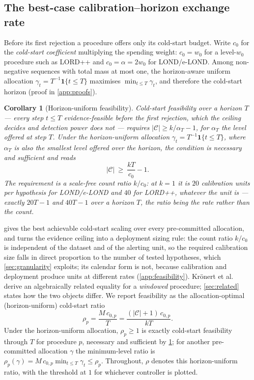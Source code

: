 \documentclass[conference]{IEEEtran}
\newtheorem{corollary}{Corollary}
\newcommand{\Cal}{\mathcal{C}}
\newcommand{\nCal}{\lvert\Cal\rvert}
\newcommand{\ceil}{M}
\begin{document}
\subsection{The best-case calibration--horizon exchange rate}\label{sec:exchange}

Before its first rejection a procedure offers only its cold-start budget. Write $c_0$ for the
\emph{cold-start coefficient} multiplying the spending weight: $c_0=w_0$ for a level-$w_0$ procedure
such as LORD++ and $c_0=\alpha=2w_0$ for LOND/e-LOND. Among non-negative sequences with total mass at
most one, the horizon-aware uniform allocation $\gamma_t=T^{-1}\mathbf 1\{t\le T\}$ maximises $\min_{t\le T}\gamma_t$, and
therefore the cold-start horizon (proof in \cref{app:proofs}).

\begin{corollary}[Horizon-uniform feasibility]\label{cor:budget}
Cold-start feasibility over a horizon $T$ --- every step $t\le T$ evidence-feasible before the first
rejection, which the ceiling decides and detection power does not --- requires $\nCal\ge k/\alpha_T-1$,
for $\alpha_T$ the level offered at step $T$. Under the horizon-uniform allocation
$\gamma_t=T^{-1}\mathbf 1\{t\le T\}$, where $\alpha_T$ is also the smallest level offered over the
horizon, the condition is necessary \emph{and} sufficient and reads
\[
\nCal\ \ge\ \frac{kT}{c_0}-1 .
\]
The requirement is a scale-free count ratio $k/c_0$: at $k=1$ it is $20$ calibration units per
hypothesis for LOND/e-LOND and $40$ for LORD++, whatever the unit is --- exactly $20T-1$ and $40T-1$
over a horizon $T$, the ratio being the rate rather than the count.
\end{corollary}

 gives the best achievable cold-start scaling over every pre-committed allocation, and
turns the evidence ceiling into a deployment sizing rule: the count ratio $k/c_0$ is independent of the
dataset and of the alerting unit, so the required calibration size falls in direct proportion to the
number of tested hypotheses, which \cref{sec:granularity} exploits; its calendar form is not, because
calibration and deployment produce units at different rates (\cref{app:feasibility}). Kr\"onert et
al.~\cite{kronert2024fdr} derive an algebraically related equality for a \emph{windowed} procedure;
\cref{sec:related} states how the two objects differ. We report feasibility as the allocation-optimal
(horizon-uniform) cold-start ratio
\begin{equation}\label{eq:rho}
\rho_p=\frac{\ceil\,c_{0,p}}{T}=\frac{(\nCal+1)\,c_{0,p}}{kT}.
\end{equation}
Under the horizon-uniform allocation, $\rho_p\ge1$ is exactly cold-start feasibility through $T$ for
procedure $p$, necessary and sufficient by \cref{cor:budget}; for another pre-committed allocation
$\gamma$ the minimum-level ratio is $\rho_p(\gamma)=\ceil\,c_{0,p}\min_{t\le T}\gamma_t\le\rho_p$.
Throughout, $\rho$ denotes this horizon-uniform ratio, with the threshold at $1$ for whichever controller
is plotted.
\end{document}
